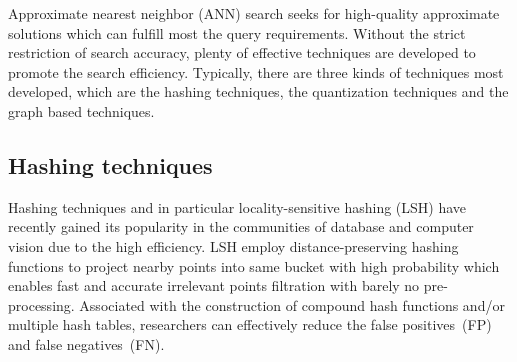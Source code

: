 \documentclass[twocolumn]{svjour3}          %
\begin{document}
Approximate nearest neighbor (ANN) search seeks for high-quality approximate solutions which can fulfill most the query requirements. Without the strict restriction of search accuracy, plenty of effective techniques are developed to promote the search efficiency. Typically, there are three kinds of techniques most developed, which are the hashing techniques, the quantization techniques and the graph based techniques.


\subsection{Hashing techniques}
Hashing techniques and in particular locality-sensitive hashing (LSH) have recently gained its popularity in the communities of database and computer vision due to the high efficiency. LSH employ distance-preserving hashing functions to project nearby points into same bucket with high probability which enables fast and accurate irrelevant points filtration with barely no pre-processing. Associated with the construction of compound hash functions and/or multiple hash tables, researchers can effectively reduce the false positives~(FP) and false negatives~(FN).
\end{document}
